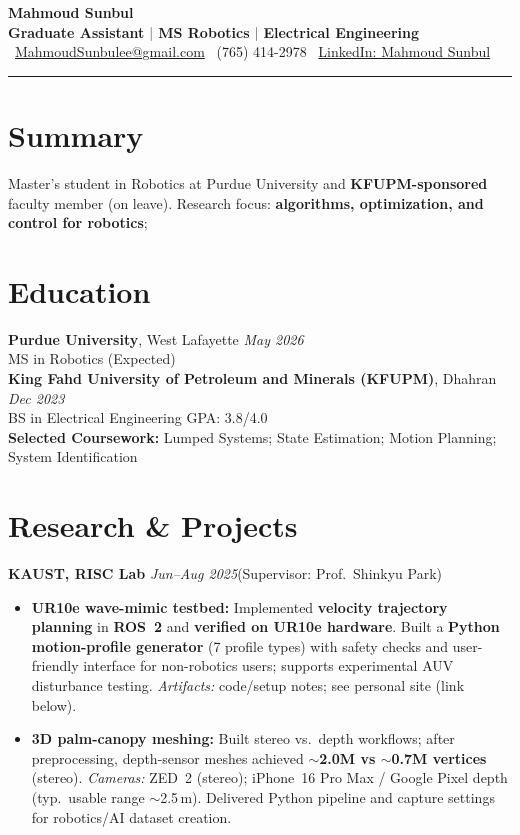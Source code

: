\documentclass[a4paper,10pt]{article}
\newcommand{\vlinebar}{\textcolor{gray}{\textbf{|}} \hspace{0.5em}}
\newcommand{\daterange}[1]{\hfill\textit{#1}}
\begin{document}
\begin{center}
  {\Huge\bfseries Mahmoud Sunbul}\\[-2pt]
  \small
  \textbf{Graduate Assistant} \vlinebar \textbf{MS Robotics} \vlinebar \textbf{Electrical Engineering}\\[2pt]
  \faEnvelope\ \href{mailto:MahmoudSunbulee@gmail.com}{MahmoudSunbulee@gmail.com}
  \hspace{8mm}\faPhone\ (765) 414-2978
  \hspace{8mm}\faLinkedin\ \href{https://www.linkedin.com/in/msunbul/}{LinkedIn: Mahmoud Sunbul}
\end{center}
\vspace{-4pt}\hrule\vspace{2pt}

\section{Summary}
Master’s student in Robotics at Purdue University and \textbf{KFUPM-sponsored} faculty member (on leave). Research focus: \textbf{algorithms, optimization, and control for robotics}; 

\section{Education}
\textbf{Purdue University}, West Lafayette \daterange{May 2026}\\
MS in Robotics \hfill (Expected)\\[2pt]
\textbf{King Fahd University of Petroleum and Minerals (KFUPM)}, Dhahran \daterange{Dec 2023}\\
BS in Electrical Engineering \hfill GPA: 3.8/4.0
\\
\textbf{Selected Coursework:}
Lumped Systems; State Estimation; Motion Planning; System Identification

\section{Research \& Projects}
\textbf{KAUST, RISC Lab} \daterange{Jun--Aug 2025}\hfill (Supervisor: Prof.\ Shinkyu Park)
\begin{itemize}
  \item \textbf{UR10e wave-mimic testbed:} Implemented \textbf{velocity trajectory planning} in \textbf{ROS~2} and \textbf{verified on UR10e hardware}. Built a \textbf{Python motion-profile generator} (7 profile types) with safety checks and user-friendly interface for non-robotics users; supports experimental AUV disturbance testing. \emph{Artifacts:} code/setup notes; see personal site (link below).
  \vspace{2.5pt}
  \item \textbf{3D palm-canopy meshing:} Built stereo vs.\ depth workflows; after preprocessing, depth-sensor meshes achieved \textbf{\(\sim\)2.0M vs \(\sim\)0.7M vertices} (stereo). \emph{Cameras:} ZED~2 (stereo); iPhone~16 Pro Max / Google Pixel depth (typ.\ usable range \(\sim\)2.5\,m). Delivered Python pipeline and capture settings for robotics/AI dataset creation.
\end{itemize}
\end{document}
